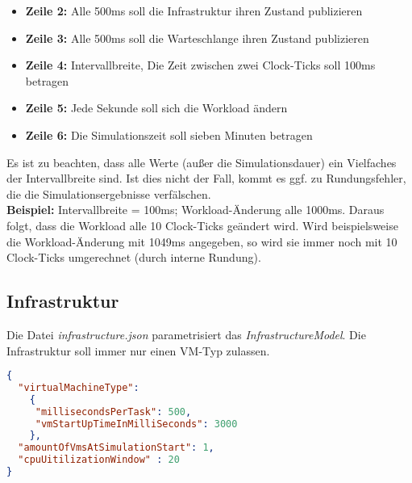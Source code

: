 \begin{itemize}
	\item \textbf{Zeile 2:} Alle 500ms soll die Infrastruktur ihren Zustand publizieren
	\item \textbf{Zeile 3:} Alle 500ms soll die Warteschlange ihren Zustand publizieren
	\item \textbf{Zeile 4:} Intervallbreite, Die Zeit zwischen zwei Clock-Ticks soll 100ms betragen 
	\item \textbf{Zeile 5:} Jede Sekunde soll sich die Workload ändern
	\item \textbf{Zeile 6:} Die Simulationszeit soll sieben Minuten betragen
	
\end{itemize}
\noindent
Es ist zu beachten, dass alle Werte (außer die Simulationsdauer) ein Vielfaches der Intervallbreite sind. Ist dies nicht der Fall, kommt es ggf. zu Rundungsfehler, die die Simulationsergebnisse verfälschen. \\
 \textbf{Beispiel:} Intervallbreite = 100ms; Workload-Änderung alle 1000ms. Daraus folgt, dass die Workload alle 10 Clock-Ticks geändert wird. Wird beispielsweise die Workload-Änderung mit 1049ms angegeben, so wird sie immer noch mit 10 Clock-Ticks umgerechnet (durch interne Rundung).
 


\subsection{Infrastruktur}
\label{sec:konfiguration:infrastruktur}
Die Datei \textit{infrastructure.json} parametrisiert das \textit{InfrastructureModel}. Die Infrastruktur soll immer nur einen VM-Typ zulassen. 

\begin{lstlisting}[language=json,firstnumber=1]
{
  "virtualMachineType": 
    {
     "millisecondsPerTask": 500,
     "vmStartUpTimeInMilliSeconds": 3000
    },
  "amountOfVmsAtSimulationStart": 1,
  "cpuUitilizationWindow" : 20
}
\end{lstlisting}

